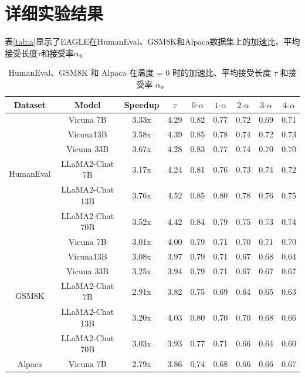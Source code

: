 \documentclass{article}
\theoremstyle{plain}
\theoremstyle{definition}
\theoremstyle{remark}
\begin{document}
\section{详细实验结果}
\label{apex}

表\ref{tab:a}显示了EAGLE在HumanEval、GSM8K和Alpaca数据集上的加速比、平均接受长度$\tau$和接受率$\alpha$。



\begin{table}
  \centering
  \caption{HumanEval、GSM8K 和 Alpaca 在温度 = 0 时的加速比、平均接受长度 $\tau$ 和接受率 $\alpha$。}
    \begin{tabular}{ccccccccc}
    \toprule
    Dataset & Model & Speedup & $\tau$     & $0\text{-}\alpha$    & $1\text{-}\alpha$    & $2\text{-}\alpha$    & $3\text{-}\alpha$    & $4\text{-}\alpha$ \\
    \midrule
    \multirow{6}[2]{*}{HumanEval} & Vicuna 7B & 3.33x & 4.29  & 0.82  & 0.77  & 0.72  & 0.69  & 0.71 \\
          & Vicuna13B & 3.58x & 4.39  & 0.85  & 0.78  & 0.74  & 0.72  & 0.73 \\
          & Vicuna 33B & 3.67x & 4.28  & 0.83  & 0.77  & 0.74  & 0.70  & 0.70 \\
          & LLaMA2-Chat 7B & 3.17x & 4.24  & 0.81  & 0.76  & 0.73  & 0.74  & 0.72 \\
          & LLaMA2-Chat 13B & 3.76x & 4.52  & 0.85  & 0.80  & 0.78  & 0.76  & 0.75 \\
          & LLaMA2-Chat 70B & 3.52x & 4.42  & 0.84  & 0.79  & 0.75  & 0.73  & 0.74 \\
    \midrule
    \multirow{6}[2]{*}{GSM8K} & Vicuna 7B & 3.01x & 4.00  & 0.79  & 0.71  & 0.70  & 0.71  & 0.70 \\
          & Vicuna13B & 3.08x & 3.97  & 0.79  & 0.71  & 0.67  & 0.68  & 0.64 \\
          & Vicuna 33B & 3.25x & 3.94  & 0.79  & 0.71  & 0.67  & 0.67  & 0.67 \\
          & LLaMA2-Chat 7B & 2.91x & 3.82  & 0.75  & 0.69  & 0.64  & 0.65  & 0.63 \\
          & LLaMA2-Chat 13B & 3.20x & 4.03  & 0.80  & 0.70  & 0.70  & 0.68  & 0.66 \\
          & LLaMA2-Chat 70B & 3.03x & 3.93  & 0.77  & 0.71  & 0.66  & 0.64  & 0.60 \\
    \midrule
    \multirow{6}[2]{*}{Alpaca} & Vicuna 7B & 2.79x & 3.86  & 0.74  & 0.68  & 0.66  & 0.66  & 0.67 \\

\end{tabular}
\end{table}
\end{document}
